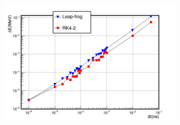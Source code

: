 \documentclass[a4paper,oneside,12pt]{report}
\numberwithin{equation}{chapter}
\begin{document}
{\iffalse \begin{figure}[H]
    \centering
    \begin{subfigure}{0.9\textwidth}
        \centering
        \includegraphics[width=\linewidth]{./figures/analiz/staticE_lf_rk2_dt-E.png}
    \end{subfigure}
    

\end{figure}}
\end{document}
